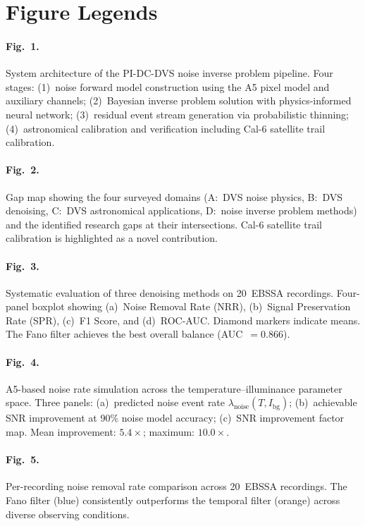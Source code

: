 \documentclass[twocolumn]{article}
\begin{document}
\newpage
\section*{Figure Legends}

\paragraph{Fig.~1.}
System architecture of the PI-DC-DVS noise inverse problem pipeline.
Four stages: (1)~noise forward model construction using the A5 pixel model and auxiliary channels; (2)~Bayesian inverse problem solution with physics-informed neural network; (3)~residual event stream generation via probabilistic thinning; (4)~astronomical calibration and verification including Cal-6 satellite trail calibration.
\label{fig:pipeline}

\paragraph{Fig.~2.}
Gap map showing the four surveyed domains (A:~DVS noise physics, B:~DVS denoising, C:~DVS astronomical applications, D:~noise inverse problem methods) and the identified research gaps at their intersections.
Cal-6 satellite trail calibration is highlighted as a novel contribution.
\label{fig:gapmap}

\paragraph{Fig.~3.}
Systematic evaluation of three denoising methods on 20~EBSSA recordings.
Four-panel boxplot showing (a)~Noise Removal Rate (NRR), (b)~Signal Preservation Rate (SPR), (c)~F1 Score, and (d)~ROC-AUC.
Diamond markers indicate means.
The Fano filter achieves the best overall balance (AUC~$= 0.866$).
\label{fig:boxplot}

\paragraph{Fig.~4.}
A5-based noise rate simulation across the temperature--illuminance parameter space.
Three panels: (a)~predicted noise event rate $\lambda_\mathrm{noise}(T, I_\mathrm{bg})$; (b)~achievable SNR improvement at 90\% noise model accuracy; (c)~SNR improvement factor map.
Mean improvement: $5.4\times$; maximum: $10.0\times$.
\label{fig:a5sim}

\paragraph{Fig.~5.}
Per-recording noise removal rate comparison across 20~EBSSA recordings.
The Fano filter (blue) consistently outperforms the temporal filter (orange) across diverse observing conditions.
\label{fig:perrecording}
\end{document}
